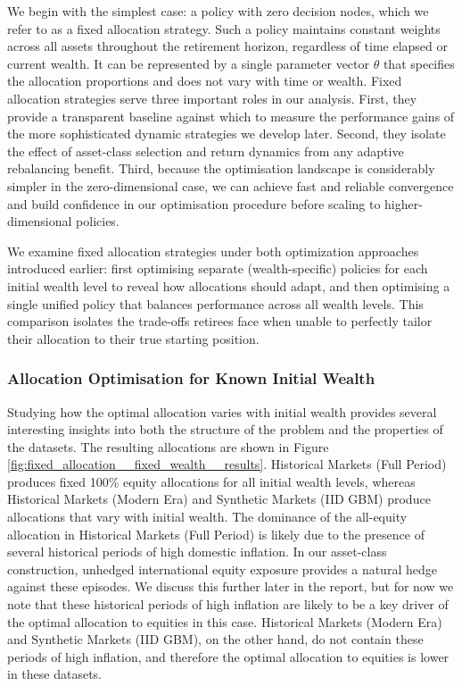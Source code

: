 \documentclass[11pt]{article}
\begin{document}
We begin with the simplest case: a policy with zero decision nodes, which we refer to as a fixed allocation strategy. Such a policy maintains constant weights across all assets throughout the retirement horizon, regardless of time elapsed or current wealth. It can be represented by a single parameter vector $\theta$ that specifies the allocation proportions and does not vary with time or wealth. Fixed allocation strategies serve three important roles in our analysis. First, they provide a transparent baseline against which to measure the performance gains of the more sophisticated dynamic strategies we develop later. Second, they isolate the effect of asset-class selection and return dynamics from any adaptive rebalancing benefit. Third, because the optimisation landscape is considerably simpler in the zero-dimensional case, we can achieve fast and reliable convergence and build confidence in our optimisation procedure before scaling to higher-dimensional policies.

We examine fixed allocation strategies under both optimization approaches introduced earlier: first optimising separate (wealth-specific) policies for each initial wealth level to reveal how allocations should adapt, and then optimising a single unified policy that balances performance across all wealth levels. This comparison isolates the trade-offs retirees face when unable to perfectly tailor their allocation to their true starting position.


\subsubsection{Allocation Optimisation for Known Initial Wealth}
\label{sec:fixed_allocation_fixed_wealth
}
Studying how the optimal allocation varies with initial wealth provides several interesting insights into both the structure of the problem and the properties of the datasets. The resulting allocations are shown in Figure \ref{fig:fixed_allocation__fixed_wealth__results}. Historical Markets (Full Period) produces fixed 100\% equity allocations for all initial wealth levels, whereas Historical Markets (Modern Era) and Synthetic Markets (IID GBM) produce allocations that vary with initial wealth. The dominance of the all-equity allocation in Historical Markets (Full Period) is likely due to the presence of several historical periods of high domestic inflation. In our asset-class construction, unhedged international equity exposure provides a natural hedge against these episodes. We discuss this further later in the report, but for now we note that these historical periods of high inflation are likely to be a key driver of the optimal allocation to equities in this case. Historical Markets (Modern Era) and Synthetic Markets (IID GBM), on the other hand, do not contain these periods of high inflation, and therefore the optimal allocation to equities is lower in these datasets.
\end{document}
